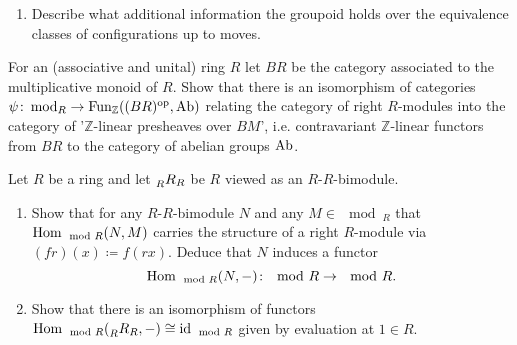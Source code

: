 \begin{Exercise}
\begin{enumerate}[label=(\alph*)]
        \item 
    
        Describe what additional information the groupoid holds over the equivalence classes of configurations up to moves.
        
    \end{enumerate}
\end{Exercise}

\begin{Exercise}
    For an (associative and unital) ring $ R $ let $ B R $ be the category associated to the multiplicative monoid of $ R $.
    Show that there is an isomorphism of categories $ \psi \colon \operatorname{mod}_R \to \operatorname{Fun}_{ \mathbb{ Z } } ( ( B R )^{ \operatorname{op} } , \operatorname{Ab} ) $ relating the category of right $ R $-modules into the category of '$ \mathbb{ Z } $-linear presheaves over $ B M $', i.e. contravariant $ \mathbb{ Z } $-linear functors from $ B R $ to the category of abelian groups $ \operatorname{Ab} $.
\end{Exercise}


\begin{Exercise}
    Let $ R $ be a ring and let $ \prescript{  }{ R }{ R }_R$ be $ R $ viewed as an $ R $-$ R $-bimodule.
    
    \begin{enumerate}[label=(\alph*)]
    
        \item 
        Show that for any $ R $-$ R $-bimodule $ N $ and any $ M \in \mod_R $ that $ \operatorname{Hom}_{ \mod R } ( N , M ) $ carries the structure of a right $ R $-module via $ ( f r ) ( x ) \coloneqq f ( r x ) $. 
        Deduce that $ N $ induces a functor
        \[
            \operatorname{Hom}_{\mod R } ( N , - ) \colon \mod R \to \mod R.
        \]
        
        \item 
        
        Show that there is an isomorphism of functors $ \operatorname{Hom}_{ \mod R } ( \prescript{}{ R }{ R }_R , - ) \cong \operatorname{id}_{ \mod R } $ given by evaluation at $ 1 \in R $.
    \end{enumerate}
\end{Exercise}


